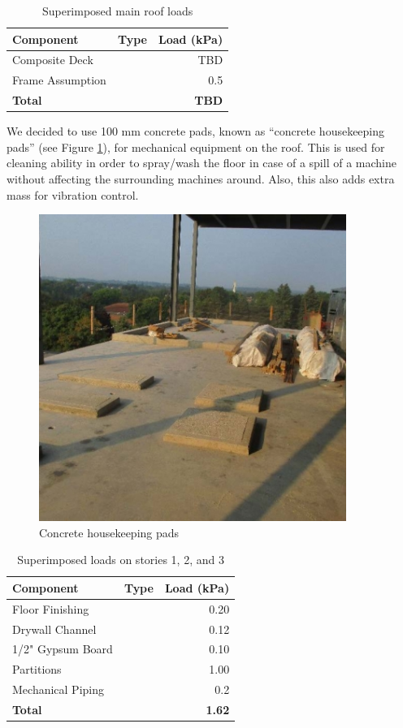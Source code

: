 \documentclass[12pt]{article}
\begin{document}
\begin{table}[h!]
    \centering
    \begin{tabular}{lcr}
        \toprule
        \textbf{Component} & \textbf{Type} & \textbf{Load (kPa)}\\
        \midrule
        Composite Deck &  & TBD\\
        Frame Assumption &  & 0.5\\
        \textbf{Total} & & \textbf{TBD}\\
        \bottomrule
    \end{tabular}
    \caption{Superimposed main roof loads}
    \label{tab:selfMain}
\end{table}

We decided to use 100 mm concrete pads, known as “concrete housekeeping pads” (see Figure \ref{fig:Housekeeping_Pads}), for mechanical equipment on the roof.
This is used for cleaning ability in order to spray/wash the floor in case of a spill of a machine without affecting the surrounding machines around.
Also, this also adds extra mass for vibration control.

\begin{figure}
    \centering
\includegraphics[width=10cm]{Assets/Housekeeping_Pads.png}
\caption{Concrete housekeeping pads}
\label{fig:Housekeeping_Pads}
\end{figure}

\begin{table}[h!]
    \centering
    \begin{tabular}{lcr}
        \toprule
        \textbf{Component} & \textbf{Type} & \textbf{Load (kPa)}\\
        \midrule
        Floor Finishing &  & 0.20\\
        Drywall Channel &  & 0.12\\
        1/2" Gypsum Board &  & 0.10\\
        Partitions &  & 1.00\\
        Mechanical Piping &  & 0.2\\
        \textbf{Total} & & \textbf{1.62}\\
        \bottomrule
    \end{tabular}
    \caption{Superimposed loads on stories 1, 2, and 3}
    \label{tab:super123}
\end{table}
\end{document}
